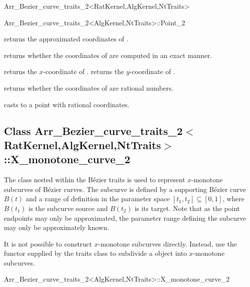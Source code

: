 \begin{ccRefClass}{Arr_Bezier_curve_traits_2<RatKernel,AlgKernel,NtTraits>}
\begin{ccClass}{Arr_Bezier_curve_traits_2<AlgKernel,NtTraits>::Point_2}
\ccAccessFunctions

  {returns the approximated coordinates of \ccVar.}

  {returns whether the coordinates of \ccVar{} are computed in an exact manner.}

  {returns the $x$-coordinate of \ccVar.
   }
\ccGlue
{}
  {returns the $y$-coordinate of \ccVar.
   }

  {returns whether the coordinates of \ccVar{} are rational numbers.}

  {casts \ccVar{} to a point with rational coordinates.
   }

\end{ccClass}


\subsection*{Class 
Arr\_Bezier\_curve\_traits\_2$<$RatKernel,AlgKernel,NtTraits$>$::X\_monotone\_curve\_2}

The  class nested within the B\'ezier traits is
used to represent $x$-monotone subcurves of B\'ezier curves. The subcurve is
defined by a supporting B\'ezier curve $B(t)$ and a range of definition in
the parameter space $[t_1, t_2] \subseteq [0, 1]$, where $B(t_1)$ is the
subcurve source and $B(t_2)$ is its target. Note that as the point endpoints
may only be approximated, the parameter range defining the subcurve may
only be approximately known.

It is not possible to construct $x$-monotone subcurves directly. Instead,
use the  functor supplied by the traits class to
subdivide a  object into $x$-monotone subcurves.

\begin{ccClass}{Arr_Bezier_curve_traits_2<AlgKernel,NtTraits>::X_monotone_curve_2}

\ccAccessFunctions


\end{ccClass}
\end{ccRefClass}
